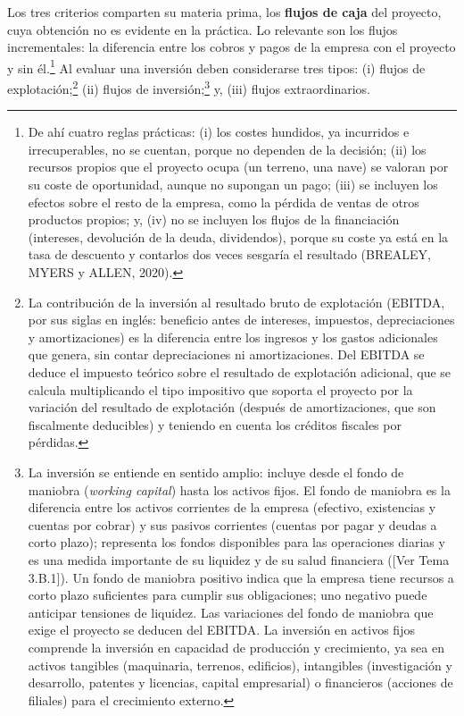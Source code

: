 \documentclass[10pt,a4paper]{article}
\newcommand{\authorfont}[1]{{\fontfamily{EBGaramond-TLF}\selectfont #1}}
\begin{document}
Los tres criterios comparten su materia prima, los \textbf{flujos de caja} del proyecto, cuya obtención no es evidente en la práctica. Lo relevante son los flujos incrementales: la diferencia entre los cobros y pagos de la empresa con el proyecto y sin él.\footnote{%
    De ahí cuatro reglas prácticas: (i) los costes hundidos, ya incurridos e irrecuperables, no se cuentan, porque no dependen de la decisión; (ii) los recursos propios que el proyecto ocupa (un terreno, una nave) se valoran por su coste de oportunidad, aunque no supongan un pago; (iii) se incluyen los efectos sobre el resto de la empresa, como la pérdida de ventas de otros productos propios; y, (iv) no se incluyen los flujos de la financiación (intereses, devolución de la deuda, dividendos), porque su coste ya está en la tasa de descuento y contarlos dos veces sesgaría el resultado (BREALEY, MYERS y ALLEN, 2020).
} Al evaluar una inversión deben considerarse tres tipos: (i) flujos de explotación;\footnote{%
    La contribución de la inversión al resultado bruto de explotación (EBITDA, por sus siglas en inglés: beneficio antes de intereses, impuestos, depreciaciones y amortizaciones) es la diferencia entre los ingresos y los gastos adicionales que genera, sin contar depreciaciones ni amortizaciones. Del EBITDA se deduce el impuesto teórico sobre el resultado de explotación adicional, que se calcula multiplicando el tipo impositivo que soporta el proyecto por la variación del resultado de explotación (después de amortizaciones, que son fiscalmente deducibles) y teniendo en cuenta los créditos fiscales por pérdidas.
} (ii) flujos de inversión;\footnote{%
    La inversión se entiende en sentido amplio: incluye desde el fondo de maniobra (\textit{working capital}) hasta los activos fijos. El fondo de maniobra es la diferencia entre los activos corrientes de la empresa (efectivo, existencias y cuentas por cobrar) y sus pasivos corrientes (cuentas por pagar y deudas a corto plazo); representa los fondos disponibles para las operaciones diarias y es una medida importante de su liquidez y de su salud financiera ([\authorfont{Ver Tema 3.B.1}]). Un fondo de maniobra positivo indica que la empresa tiene recursos a corto plazo suficientes para cumplir sus obligaciones; uno negativo puede anticipar tensiones de liquidez. Las variaciones del fondo de maniobra que exige el proyecto se deducen del EBITDA. La inversión en activos fijos comprende la inversión en capacidad de producción y crecimiento, ya sea en activos tangibles (maquinaria, terrenos, edificios), intangibles (investigación y desarrollo, patentes y licencias, capital empresarial) o financieros (acciones de filiales) para el crecimiento externo.
} y, (iii) flujos extraordinarios.
\end{document}
